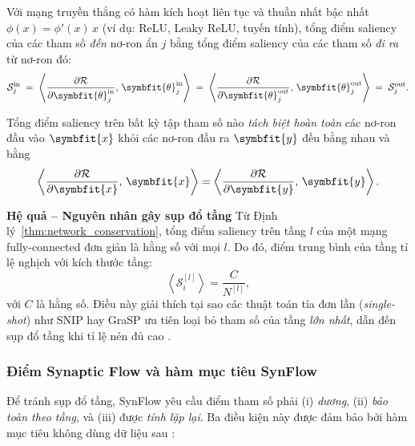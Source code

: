 \begin{theorem}
    \label{thm:neuron_conservation}
    Với mạng truyền thẳng có hàm kích hoạt liên tục và thuần nhất bậc nhất
    $\phi(x) = \phi'(x)\,x$ (ví dụ: ReLU, Leaky ReLU, tuyến tính), tổng điểm
    saliency của các tham số \emph{đến} nơ-ron ẩn $j$ bằng tổng điểm saliency
    của các tham số \emph{đi ra} từ nơ-ron đó:
    \[
        \mathcal{S}^{\mathrm{in}}_j
        \;=\; \left\langle \frac{\partial \mathcal{R}}{\partial \symbfit{\theta}^{\mathrm{in}}_j},\,
        \symbfit{\theta}^{\mathrm{in}}_j \right\rangle
        \;=\; \left\langle \frac{\partial \mathcal{R}}{\partial \symbfit{\theta}^{\mathrm{out}}_j},\,
        \symbfit{\theta}^{\mathrm{out}}_j \right\rangle
        \;=\; \mathcal{S}^{\mathrm{out}}_j.
    \]
\end{theorem}

\begin{theorem}
    \label{thm:network_conservation}
    Tổng điểm saliency trên bất kỳ tập tham số nào \emph{tách biệt hoàn toàn}
    các nơ-ron đầu vào $\symbfit{x}$ khỏi các nơ-ron đầu ra $\symbfit{y}$ đều
    bằng nhau và bằng
    \[
        \left\langle \frac{\partial \mathcal{R}}{\partial \symbfit{x}},\,\symbfit{x} \right\rangle
        = \left\langle \frac{\partial \mathcal{R}}{\partial \symbfit{y}},\,\symbfit{y} \right\rangle.
    \]
\end{theorem}

\noindent
\textbf{Hệ quả -- Nguyên nhân gây sụp đổ tầng}\;
Từ Định lý~\ref{thm:network_conservation}, tổng điểm saliency trên tầng $l$
của một mạng fully-connected đơn giản là hằng số với mọi $l$. Do đó, điểm
trung bình của tầng tỉ lệ nghịch với kích thước tầng:
\[
    \left\langle \mathcal{S}^{[l]}_i \right\rangle = \frac{C}{N^{[l]}},
\]
với $C$ là hằng số. Điều này giải thích tại sao các thuật toán tỉa đơn lần
(\emph{single-shot}) như SNIP hay GraSP ưu tiên loại bỏ tham số của tầng
\emph{lớn nhất}, dẫn đến sụp đổ tầng khi tỉ lệ nén đủ cao \cite{synflow}.

\subsubsection{\textbf{Điểm Synaptic Flow và hàm mục tiêu SynFlow}}
\label{subsubsec:synflow_score}

Để tránh sụp đổ tầng, SynFlow yêu cầu điểm tham số phải (i) \emph{dương},
(ii) \emph{bảo toàn theo tầng}, và (iii) được \emph{tính lặp lại}. Ba điều
kiện này được đảm bảo bởi hàm mục tiêu không dùng dữ liệu sau \cite{synflow}:

